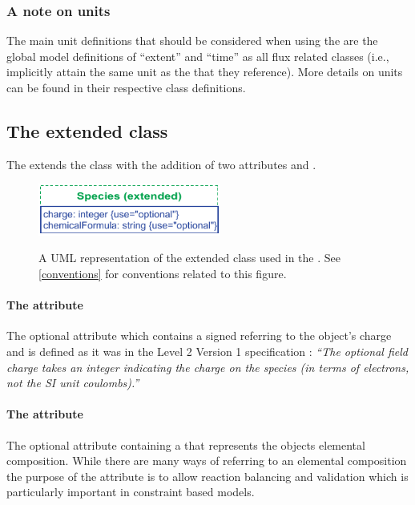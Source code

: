 \subsubsection{A note on units}
\label{fbcunits}
The main unit definitions that should be considered when using the \FBCPackage
are the global model definitions of ``extent''  and ``time'' as all \FBC flux
related classes (i.e., %
\FluxObjective implicitly attain the same
unit as the \Reaction that they reference). More details on units can be found
in their respective class definitions.

\subsection{The extended  class}
\label{species-class}

The \FBCPackage extends the \sbmlthreecore \Species class with the addition
of two attributes  and .
%
\begin{figure}[h]
  \centering
  \includegraphics[width=6cm]{images/v2harmony_fbc_species.pdf}\\
  \caption{A UML representation of the extended \SBML \Species class used in
  the \FBCPackage. See \ref{conventions} for conventions related to this
  figure.}
  \label{fig:fbc_uml_species}
\end{figure}


\paragraph{The  attribute}
The optional attribute  which contains a signed
 referring to the \Species object's charge and is
defined as it was in the \SBML Level 2 Version 1 specification
: \textit{``The optional field charge takes an integer indicating
the charge on the species (in terms of electrons, not the SI unit coulombs).''}

\paragraph{The  attribute}
\label{chemicalFormula-attribute}
The optional attribute  containing a
 that represents the \Species objects elemental
composition.
%
%
While there are many ways of referring to an elemental composition the purpose
of the  attribute is to allow reaction balancing and
validation which is particularly important in constraint based models.

